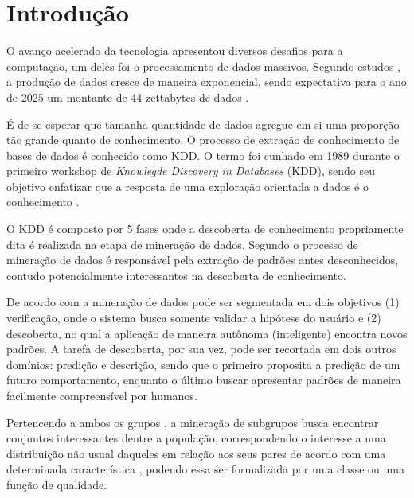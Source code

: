 \chapter[Introdução]{Introdução}
\label{introducao}



% 

O avanço acelerado da tecnologia apresentou diversos desafios para a computação, um deles foi o processamento de dados massivos. Segundo estudos \cite{hilbert2011world, gantz2012digital}, a produção de dados cresce de maneira exponencial, sendo expectativa para o ano de 2025 um montante de 44 zettabytes de dados \cite{Cassidy2019Mar}. 

É de se esperar que tamanha quantidade de dados agregue em si uma proporção tão grande quanto de conhecimento. O processo de extração de conhecimento de bases de dados é conhecido como KDD. O termo foi cunhado em 1989 durante o primeiro workshop de \textit{Knowlegde Discovery in Databases} (KDD), sendo seu objetivo enfatizar que a resposta de uma exploração orientada a dados é o conhecimento \cite{piatetsky1995knowledge}.

O KDD é composto por 5 fases onde a descoberta de conhecimento propriamente dita é realizada na etapa de mineração de dados. Segundo  o processo de mineração de dados é responsável pela extração de padrões antes desconhecidos, contudo potencialmente interessantes na descoberta de conhecimento.

De acordo com  a mineração de dados pode ser segmentada em dois objetivos (1) verificação, onde o sistema busca somente validar a hipótese do usuário e (2) descoberta, no qual a aplicação de maneira autônoma (inteligente) encontra novos padrões. A tarefa de descoberta, por sua vez, pode ser recortada em dois outros domínios: predição e descrição, sendo que o primeiro proposita a predição de um futuro comportamento, enquanto o último buscar apresentar padrões de maneira facilmente compreensível por humanos.

Pertencendo a ambos os grupos \cite{novak2009supervised}, a mineração de subgrupos busca encontrar conjuntos interessantes dentre a população, correspondendo o interesse a uma distribuição não usual daqueles em relação aos seus pares de acordo com uma determinada característica \cite{wrobel1997algorithm}, podendo essa ser formalizada por uma classe ou uma função de qualidade.

